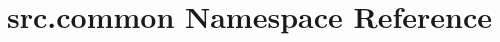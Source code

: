 \hypertarget{namespacesrc_1_1common}{\section{src.\+common Namespace Reference}
\label{namespacesrc_1_1common}
}

